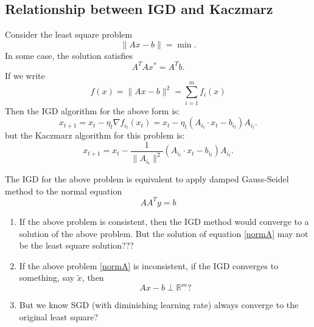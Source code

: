 \subsection{Relationship between IGD and Kaczmarz}
Consider the least square problem
$$
\|Ax-b\|=\min.
$$
In some case, the solution satisfies 
$$
A^TAx^*=A^Tb. 
$$
If we write 
$$
f(x)=\|Ax-b\|^2=\sum_{i=1}^mf_i(x)
$$
Then the IGD algorithm for the above form is:
\begin{equation}\label{equ:IGDforLS}
x_{t+1} = x_t - \eta_t \nabla f_{i_t}(x_t) = x_t - \eta_t (A_{i_t} \cdot x_t - b_{i_t})A_{i_t}.
\end{equation}
but the Kaczmarz algorithm for this problem is:
\begin{equation}\label{equ:KacamarzAlgo}
x_{t+1} = x_t -  \frac{1}{\|A_{i_t}\|^2}(A_{i_t} \cdot x_t - b_{i_t})A_{i_t}. 
\end{equation}

The IGD for the above problem is equivalent to apply damped
Gauss-Seidel method to the normal equation
\begin{equation}
\label{normA}
AA^Ty=b  
\end{equation}
\begin{enumerate}
	\item If the above problem is consistent, then the IGD method would
	converge to a solution of the above problem.  But the solution of
	equation \eqref{normA} may not be the least square solution???
	
	\item If the above problem \eqref{normA} is inconsistent, if the IGD
	converges to something, say $\tilde x$, then 
	$$
	Ax-b\perp \mathbb R^m?
	$$
	\item But we know SGD (with diminishing learning rate) always converge
	to the original least square?
\end{enumerate}

